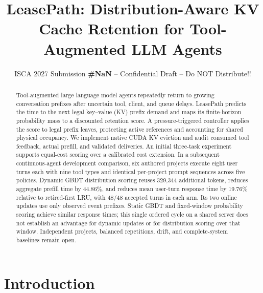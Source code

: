 \documentclass[sigconf, screen, review, balance=false]{acmart}
\newcommand{\iscasubmissionnumber}{NaN}
\begin{document}
\title{LeasePath: Distribution-Aware KV Cache Retention for Tool-Augmented LLM Agents}
\author{ISCA 2027 Submission \textbf{\#\iscasubmissionnumber} -- Confidential Draft -- Do NOT Distribute!!}
\renewcommand{\shortauthors}{ISCA 2027 Submission \#\iscasubmissionnumber}

\begin{abstract}
Tool-augmented large language model agents repeatedly return to growing
conversation prefixes after uncertain tool, client, and queue delays.
LeasePath predicts the time to the next legal key--value (KV) prefix
demand and maps its finite-horizon probability mass to a discounted
retention score. A pressure-triggered controller applies the score to
legal prefix leaves, protecting active references and accounting for
shared physical occupancy. We implement native CUDA KV eviction and
audit consumed tool feedback, actual prefill, and validated deliveries.
An initial three-task experiment supports equal-cost scoring over a
calibrated cost extension. In a subsequent continuous-agent development
comparison, six authored projects execute eight user turns each with
nine tool types and identical per-project prompt sequences across five
policies. Dynamic GBDT distribution scoring reuses 329,344 additional
tokens, reduces aggregate prefill time by 44.86\%, and reduces mean
user-turn response time by 19.76\% relative to retired-first LRU, with
48/48 accepted turns in each arm. Its two online updates use only
observed event prefixes. Static GBDT and fixed-window probability
scoring achieve similar response times; this single ordered cycle on a
shared server does not establish an advantage for dynamic updates or
for distribution scoring over that window. Independent projects,
balanced repetitions, drift, and complete-system baselines remain open.

\end{abstract}
\maketitle

\section{Introduction}\label{introduction}
\end{document}
